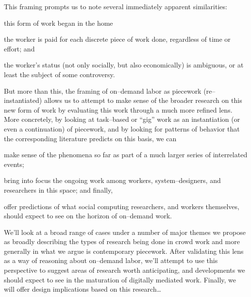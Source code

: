 \documentclass[trackingWork]{subfiles}
\begin{document}
This framing prompts us to note several immediately apparent similarities:
\begin{inlinelist}
\item this form of work began in the home
\item the worker is paid for each discrete piece of work done, regardless of time or effort; and
\item the worker's status
(not only socially, but also economically)
is ambiguous, or at least the subject of some controversy.
\end{inlinelist}



But more than this,
the framing of on--demand labor as piecework (re--instantiated)
allows us to attempt to make sense of the broader research on this new form of work
by evaluating this work through a much more refined lens.
More concretely, by looking at task--based or ``gig'' work as
an instantiation (or even a continuation) of piecework,
and by looking for patterns of behavior that the corresponding literature predicts
on this basis, we can
\begin{inlinelist}
  \item make sense of the phenomena so far as part of a much larger series of interrelated events;
  \item bring into focus the ongoing work among workers, system--designers, and researchers in this space; and finally,
  \item offer predictions of what social computing researchers,
        and workers themselves,
        should expect to see on the horizon of on--demand work.
\end{inlinelist}

We'll look at a broad range of cases under a number of major themes
we propose as broadly describing the types of research being done in crowd work
and more generally in what we argue is contemporary piecework.
After validating this lens as a way of reasoning about on--demand labor,
we'll attempt to use this perspective to suggest areas of research worth anticipating,
and developments we should expect to see in the maturation of digitally mediated work.
Finally, we will offer design implications based on this research\dots {}
\end{document}
